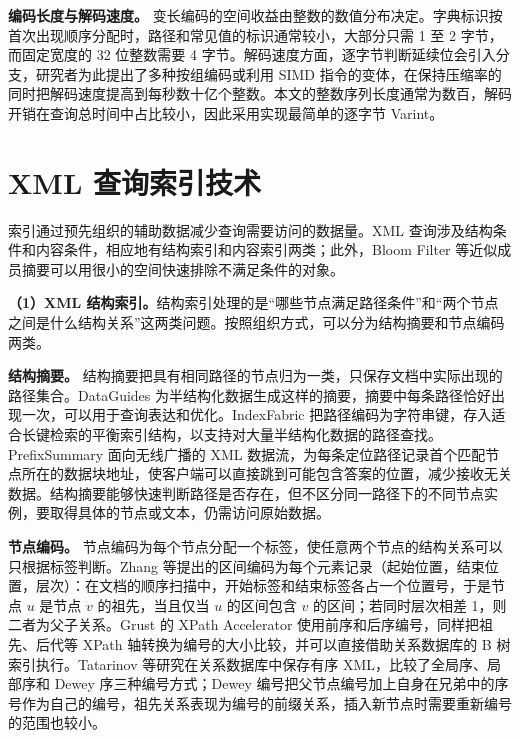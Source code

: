 \textbf{编码长度与解码速度。} 变长编码的空间收益由整数的数值分布决定。字典标识按首次出现顺序分配时，路径和常见值的标识通常较小，大部分只需 1 至 2 字节，而固定宽度的 32 位整数需要 4 字节。解码速度方面，逐字节判断延续位会引入分支，研究者为此提出了多种按组编码或利用 SIMD 指令的变体，在保持压缩率的同时把解码速度提高到每秒数十亿个整数\cite{lemire2015decoding}。本文的整数序列长度通常为数百，解码开销在查询总时间中占比较小，因此采用实现最简单的逐字节 Varint。

\section{XML 查询索引技术}

索引通过预先组织的辅助数据减少查询需要访问的数据量。XML 查询涉及结构条件和内容条件，相应地有结构索引和内容索引两类；此外，Bloom Filter 等近似成员摘要可以用很小的空间快速排除不满足条件的对象。

\textbf{（1）XML 结构索引。}结构索引处理的是“哪些节点满足路径条件”和“两个节点之间是什么结构关系”这两类问题。按照组织方式，可以分为结构摘要和节点编码两类。

\textbf{结构摘要。} 结构摘要把具有相同路径的节点归为一类，只保存文档中实际出现的路径集合。DataGuides 为半结构化数据生成这样的摘要，摘要中每条路径恰好出现一次，可以用于查询表达和优化\cite{goldman1997dataguides}。IndexFabric 把路径编码为字符串键，存入适合长键检索的平衡索引结构，以支持对大量半结构化数据的路径查找\cite{cooper2001fast}。PrefixSummary 面向无线广播的 XML 数据流，为每条定位路径记录首个匹配节点所在的数据块地址，使客户端可以直接跳到可能包含答案的位置，减少接收无关数据\cite{park2012prefixsummary}。结构摘要能够快速判断路径是否存在，但不区分同一路径下的不同节点实例，要取得具体的节点或文本，仍需访问原始数据。

\textbf{节点编码。} 节点编码为每个节点分配一个标签，使任意两个节点的结构关系可以只根据标签判断。Zhang 等提出的区间编码为每个元素记录（起始位置，结束位置，层次）：在文档的顺序扫描中，开始标签和结束标签各占一个位置号，于是节点 $u$ 是节点 $v$ 的祖先，当且仅当 $u$ 的区间包含 $v$ 的区间；若同时层次相差 1，则二者为父子关系\cite{zhang2001supporting}。Grust 的 XPath Accelerator 使用前序和后序编号，同样把祖先、后代等 XPath 轴转换为编号的大小比较，并可以直接借助关系数据库的 B 树索引执行\cite{grust2002accelerating}。Tatarinov 等研究在关系数据库中保存有序 XML，比较了全局序、局部序和 Dewey 序三种编号方式；Dewey 编号把父节点编号加上自身在兄弟中的序号作为自己的编号，祖先关系表现为编号的前缀关系，插入新节点时需要重新编号的范围也较小\cite{tatarinov2002storing}。


